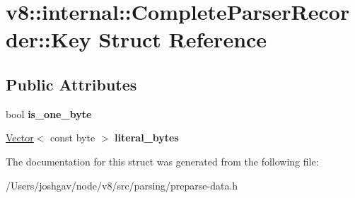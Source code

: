 \hypertarget{structv8_1_1internal_1_1_complete_parser_recorder_1_1_key}{}\section{v8\+:\+:internal\+:\+:Complete\+Parser\+Recorder\+:\+:Key Struct Reference}
\label{structv8_1_1internal_1_1_complete_parser_recorder_1_1_key}
\subsection*{Public Attributes}
\begin{DoxyCompactItemize}
\item 
bool {\bfseries is\+\_\+one\+\_\+byte}\hypertarget{structv8_1_1internal_1_1_complete_parser_recorder_1_1_key_a4b2dc1307041b63a07f222bf7ab28855}{}\label{structv8_1_1internal_1_1_complete_parser_recorder_1_1_key_a4b2dc1307041b63a07f222bf7ab28855}

\item 
\hyperlink{classv8_1_1internal_1_1_vector}{Vector}$<$ const byte $>$ {\bfseries literal\+\_\+bytes}\hypertarget{structv8_1_1internal_1_1_complete_parser_recorder_1_1_key_a25cf6b18414e40a8620246c6ad6fdce6}{}\label{structv8_1_1internal_1_1_complete_parser_recorder_1_1_key_a25cf6b18414e40a8620246c6ad6fdce6}

\end{DoxyCompactItemize}


The documentation for this struct was generated from the following file\+:\begin{DoxyCompactItemize}
\item 
/\+Users/joshgav/node/v8/src/parsing/preparse-\/data.\+h\end{DoxyCompactItemize}
